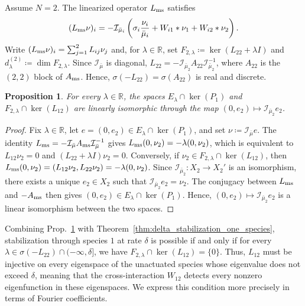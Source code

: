 \documentclass[letterpaper, 10pt, conference]{ieeeconf}
\newtheorem{proposition}[theorem]{Proposition}
\newcommand{\R}{\mathbb{R}}
\newcommand{\rieszmap}[1][\mu]{\mathcal{I}_{#1}}
\begin{document}
Assume $N = 2$.
The linearized operator $L_{\rm ms}$ satisfies
\[
(L_{\rm ms}\nu)_i = -\rieszmap[\bar\mu_i] \left(\sigma_i \frac{\nu_i}{\bar\mu_i} + W_{i1} \ast \nu_1 + W_{i2} \ast \nu_2\right).
\]
Write $(L_{\rm ms}\nu)_i = \sum_{j=1}^2 L_{ij}\nu_j$ and, for $\lambda \in \R$, set $F_{2,\lambda} \coloneqq \ker(L_{22} + \lambda I)$ and $d_\lambda^{(2)} \coloneqq \dim F_{2,\lambda}$.
Since $\rieszmap[\bar\mu]$ is diagonal, $L_{22} = -\rieszmap[\bar\mu_2] A_{22} \rieszmap[\bar\mu_2]^{-1}$, where $A_{22}$ is the $(2,2)$ block of $A_{\rm ms}$. 
Hence, $\sigma(-L_{22}) = \sigma(A_{22})$ is real and discrete.

\begin{proposition}
    \label{prop:invisible_modes_two_species}
    For every $\lambda \in \R$, the spaces $E_\lambda \cap \ker(P_1)$ and $F_{2,\lambda} \cap \ker(L_{12})$ are linearly isomorphic through the map $(0, e_2) \mapsto \rieszmap[\bar\mu_2] e_2$.
\end{proposition}

\begin{proof}
    Fix $\lambda \in \R$, let $e = (0, e_2) \in E_\lambda \cap \ker(P_1)$, and set $\nu \coloneqq \rieszmap[\bar\mu] e$.
    The identity $L_{\rm ms} = -\rieszmap[\bar\mu]A_{\rm ms}\rieszmap[\bar\mu]^{-1}$ gives $L_{\rm ms}(0,\nu_2) = -\lambda(0,\nu_2)$, which is equivalent to $L_{12}\nu_2 = 0$ and $(L_{22} + \lambda I) \nu_2 = 0$.
    Conversely, if $\nu_2 \in F_{2,\lambda} \cap \ker(L_{12})$, then $L_{\rm ms}(0,\nu_2) = (L_{12}\nu_2,L_{22}\nu_2) = -\lambda(0,\nu_2)$.
    Since $\rieszmap[\bar\mu_2] : X_2 \to X_2'$ is an isomorphism, there exists a unique $e_2 \in X_2$ such that $\rieszmap[\bar\mu_2] e_2 = \nu_2$.
    The conjugacy between $L_{\rm ms}$ and $-A_{\rm ms}$ then gives $(0,e_2) \in E_\lambda \cap \ker(P_1)$.
    Hence, $(0,e_2) \mapsto \rieszmap[\bar\mu_2]e_2$ is a linear isomorphism between the two spaces.
\end{proof}

Combining Prop.~\ref{prop:invisible_modes_two_species} with Theorem~\ref{thm:delta_stabilization_one_species}, stabilization through species $1$ at rate $\delta$ is possible if and only if for every $\lambda \in \sigma(-L_{22}) \cap (-\infty, \delta]$, we have $F_{2,\lambda} \cap \ker(L_{12}) = \{0\}$.
Thus, $L_{12}$ must be injective on every eigenspace of the unactuated species whose eigenvalue does not exceed $\delta$, meaning that the cross-interaction $W_{12}$ detects every nonzero eigenfunction in these eigenspaces.
We express this condition more precisely in terms of Fourier coefficients.
\end{document}
